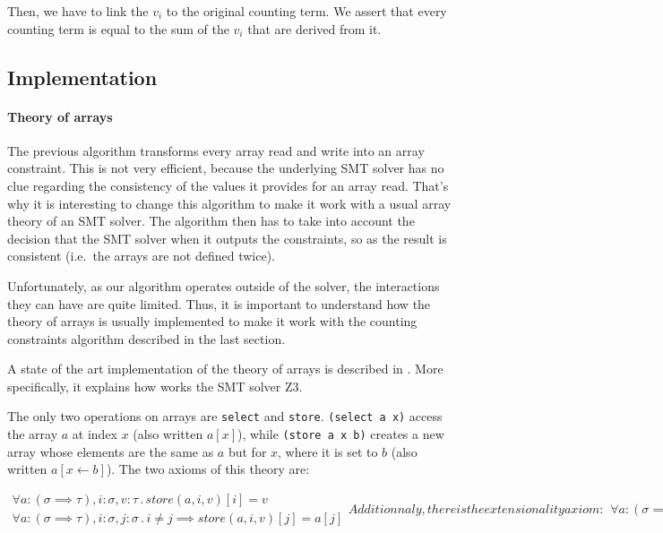 {Then, we have to link the $v_i$ to the original counting term. We assert that
every counting term is equal to the sum of the $v_i$ that are derived from it.

}

\subsection{Implementation}

\paragraph{Theory of arrays} The previous algorithm transforms every array read and write into an
array constraint. This is not very efficient, because the underlying SMT
solver has no clue regarding the consistency of the values it provides
for an array read. That's why it is interesting to change this algorithm
to make it work with a usual array theory of an SMT solver. The
algorithm then has to take into account the decision that the SMT solver
when it outputs the constraints, so as the result is consistent
(i.e.~the arrays are not defined twice).

Unfortunately, as our algorithm operates outside of the solver, the
interactions they can have are quite limited. Thus, it is important to
understand how the theory of arrays is usually implemented to make it
work with the counting constraints algorithm described in the last
section.

A state of the art implementation of the theory of arrays is described
in \cite{de2009generalized}. More specifically, it
explains how works the SMT solver Z3.

The only two operations on arrays are \texttt{select} and
\texttt{store}. \texttt{(select\ a\ x)} access the array $a$ at index
$x$ (also written $a[x]$), while \texttt{(store\ a\ x\ b)} creates a
new array whose elements are the same as $a$ but for $x$, where it
is set to $b$ (also written $a[x \leftarrow b]$). The two axioms of this theory are:

\begin{subequations}
    \begin{align}
        \forall a:(\sigma \implies \tau), i:\sigma, v:\tau\, .\, store(a, i, v)[i] = v
        \\
        \forall a:(\sigma \implies \tau), i:\sigma, j:\sigma\, .\, i \neq j \implies store(a, i, v)[j] = a[j]
    \end{align}


    Additionnaly, there is the extensionality axiom:

    \begin{align}
        \forall a:(\sigma \implies \tau), b:(\sigma \implies \tau)\, .\, a \neq b \iff \exists i\: a[i] \implies a[i] \neq b[i]
    \end{align}
\end{subequations}

